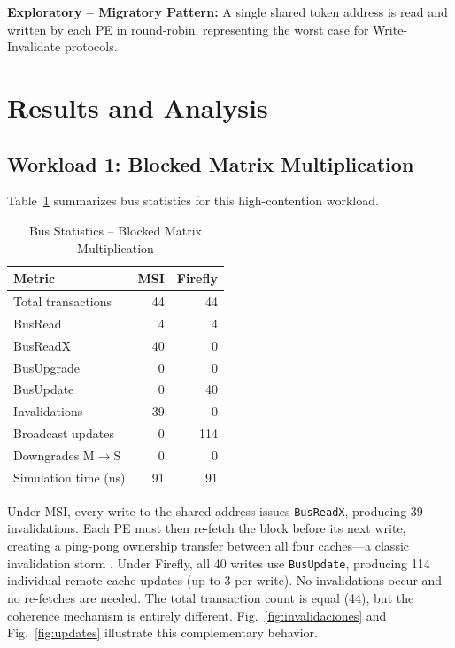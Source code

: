 \documentclass[journal,trans]{IEEEtran}
\begin{document}
\textbf{Exploratory -- Migratory Pattern:}
A single shared token address is read and written by each PE in round-robin,
representing the worst case for Write-Invalidate protocols.
 
\section{Results and Analysis}
\label{sec:results}
 
\subsection{Workload 1: Blocked Matrix Multiplication}
 
Table~\ref{tab:matmul} summarizes bus statistics for this high-contention
workload.
 \begin{table}[htbp]
 \centering
\caption{Bus Statistics -- Blocked Matrix Multiplication}
\label{tab:matmul}
\renewcommand{\arraystretch}{1.2}
\begin{tabular}{lrr}
\toprule
\textbf{Metric}         & \textbf{MSI} & \textbf{Firefly} \\
\midrule
Total transactions      & 44  & 44  \\
BusRead                 & 4   & 4   \\
BusReadX                & 40  & 0   \\
BusUpgrade              & 0   & 0   \\
BusUpdate               & 0   & 40  \\
Invalidations           & 39  & 0   \\
Broadcast updates       & 0   & 114 \\
Downgrades M$\to$S      & 0   & 0   \\
Simulation time (ns)    & 91  & 91  \\
\bottomrule
\end{tabular}
\end{table}
 
Under MSI, every write to the shared address issues \texttt{BusReadX}, producing
39 invalidations. Each PE must then re-fetch the block before its next write,
creating a ping-pong ownership transfer between all four caches---a classic
invalidation storm \cite{archibald1986cache}. Under Firefly, all 40 writes use
\texttt{BusUpdate}, producing 114 individual remote cache updates (up to 3 per
write). No invalidations occur and no re-fetches are needed. The total
transaction count is equal (44), but the coherence mechanism is entirely
different. Fig.~\ref{fig:invalidaciones} and Fig.~\ref{fig:updates} illustrate
this complementary behavior.
 
\end{document}
